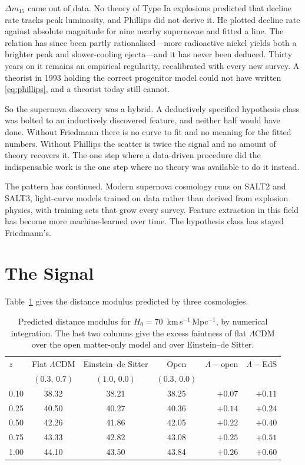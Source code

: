 \documentclass[11pt]{article}
\begin{document}
$\Delta m_{15}$ came out of data.  No theory of Type Ia explosions predicted
that decline rate tracks peak luminosity, and Phillips did not derive it.  He
plotted decline rate against absolute magnitude for nine nearby supernovae and
fitted a line.  The relation has since been partly rationalised---more
radioactive nickel yields both a brighter peak and slower-cooling ejecta---and
it has never been deduced.  Thirty years on it remains an empirical
regularity, recalibrated with every new survey.  A theorist in 1993 holding
the correct progenitor model could not have written \eqref{eq:phillips}, and a
theorist today still cannot.

So the supernova discovery was a hybrid.  A deductively specified hypothesis
class was bolted to an inductively discovered feature, and neither half would
have done.  Without Friedmann there is no curve to fit and no meaning for the
fitted numbers.  Without Phillips the scatter is twice the signal and no
amount of theory recovers it.  The one step where a data-driven procedure did
the indispensable work is the one step where no theory was available to do it
instead.

The pattern has continued.  Modern supernova cosmology runs on SALT2 and
SALT3, light-curve models trained on data rather than derived from explosion
physics, with training sets that grow every survey.  Feature extraction in
this field has become more machine-learned over time.  The hypothesis class
has stayed Friedmann's.

\section{The Signal}

Table~\ref{tab:mu} gives the distance modulus predicted by three cosmologies.

\begin{table}[ht]
\centering
\caption{Predicted distance modulus for
$H_0 = 70$~km\,s$^{-1}$\,Mpc$^{-1}$, by numerical integration.  The last two
columns give the excess faintness of flat $\Lambda$CDM over the open
matter-only model and over Einstein--de Sitter.}
\label{tab:mu}
\medskip
\begin{tabular}{lcccrr}
\toprule
$z$ & Flat $\Lambda$CDM & Einstein--de Sitter & Open
  & $\Lambda-$open & $\Lambda-$EdS \\
 & $(0.3,\,0.7)$ & $(1.0,\,0.0)$ & $(0.3,\,0.0)$ & & \\
\midrule
0.10 & 38.32 & 38.21 & 38.25 & $+0.07$ & $+0.11$ \\
0.25 & 40.50 & 40.27 & 40.36 & $+0.14$ & $+0.24$ \\
0.50 & 42.26 & 41.86 & 42.05 & $+0.22$ & $+0.40$ \\
0.75 & 43.33 & 42.82 & 43.08 & $+0.25$ & $+0.51$ \\
1.00 & 44.10 & 43.50 & 43.84 & $+0.26$ & $+0.60$ \\
\bottomrule
\end{tabular}
\end{table}
\end{document}
